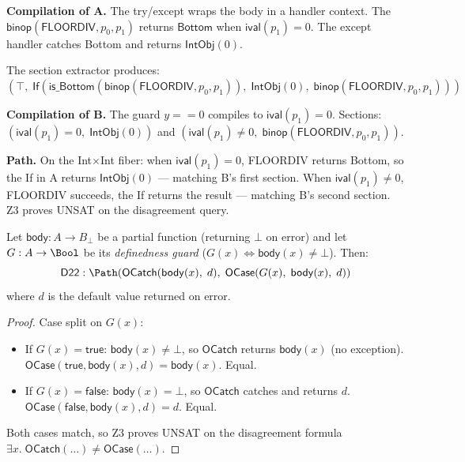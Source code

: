 \textbf{Compilation of A.}
The try/except wraps the body in a handler context.  The
$\mathsf{binop}(\mathsf{FLOORDIV}, p_0, p_1)$ returns
$\mathsf{Bottom}$ when $\mathsf{ival}(p_1) = 0$.  The except
handler catches Bottom and returns $\mathsf{IntObj}(0)$.

The section extractor produces:
$(\top,\; \mathsf{If}(\mathsf{is\_Bottom}(\mathsf{binop}(\mathsf{FLOORDIV},
p_0, p_1)),\; \mathsf{IntObj}(0),\; \mathsf{binop}(\mathsf{FLOORDIV},
p_0, p_1)))$

\textbf{Compilation of B.}
The guard $y == 0$ compiles to $\mathsf{ival}(p_1) = 0$.  Sections:
$(\mathsf{ival}(p_1) = 0,\; \mathsf{IntObj}(0))$ and
$(\mathsf{ival}(p_1) \neq 0,\; \mathsf{binop}(\mathsf{FLOORDIV}, p_0, p_1))$.

\textbf{Path.}
On the Int$\times$Int fiber: when $\mathsf{ival}(p_1) = 0$,
FLOORDIV returns Bottom, so the If in A returns $\mathsf{IntObj}(0)$
--- matching B's first section.  When $\mathsf{ival}(p_1) \neq 0$,
FLOORDIV succeeds, the If returns the result --- matching B's second
section.  Z3 proves UNSAT on the disagreement query.

\begin{theorem}
\label{thm:d22-effect}
Let $\mathsf{body} : A \to B_\bot$ be a partial function (returning
$\bot$ on error) and let $G : A \to \Bool$ be its \emph{definedness
guard} ($G(x) \Leftrightarrow \mathsf{body}(x) \neq \bot$).  Then:
\[
  \mathsf{D22} : \Path\!\left(
    \mathsf{OCatch}(\mathsf{body}(x),\; d),\;
    \mathsf{OCase}(G(x),\; \mathsf{body}(x),\; d)
  \right)
\]
where $d$ is the default value returned on error.
\end{theorem}

\begin{proof}
Case split on $G(x)$:
\begin{itemize}
  \item If $G(x) = \mathsf{true}$: $\mathsf{body}(x) \neq \bot$,
    so $\mathsf{OCatch}$ returns $\mathsf{body}(x)$ (no exception).
    $\mathsf{OCase}(\mathsf{true}, \mathsf{body}(x), d) =
    \mathsf{body}(x)$.  Equal.
  \item If $G(x) = \mathsf{false}$: $\mathsf{body}(x) = \bot$, so
    $\mathsf{OCatch}$ catches and returns $d$.
    $\mathsf{OCase}(\mathsf{false}, \mathsf{body}(x), d) = d$.
    Equal.
\end{itemize}
Both cases match, so Z3 proves UNSAT on the disagreement formula
$\exists x.\; \mathsf{OCatch}(\ldots) \neq \mathsf{OCase}(\ldots)$.
\end{proof}

